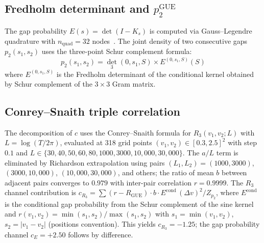\subsection*{Fredholm determinant and $p_2^{\mathrm{GUE}}$}

The gap probability $E(s) = \det(I - K_s)$ is computed via Gauss--Legendre
quadrature with $n_{\mathrm{quad}} = 32$ nodes~\cite{bornemann2010}.
The joint density of two consecutive gaps $p_2(s_1, s_2)$ uses the
three-point Schur complement formula:
\begin{equation}
p_2(s_1, s_2) = \det_3(0, s_1, S) \times E^{(0, s_1, S)}(S)
\end{equation}
where $E^{(0, s_1, S)}$ is the Fredholm determinant of the conditional kernel
obtained by Schur complement of the $3\times 3$ Gram matrix.

\subsection*{Conrey--Snaith triple correlation}

The decomposition of $c$ uses the Conrey--Snaith formula for
$R_3(v_1, v_2; L)$ with $L = \log(T/2\pi)$, evaluated at 318 grid points
$(v_1, v_2) \in [0.3, 2.5]^2$ with step $0.1$ and
$L \in \{30, 40, 50, 60, 80, 1000, 3000, 10{,}000, 30{,}000\}$.
The $a/L$ term is eliminated by Richardson extrapolation using pairs
$(L_1, L_2) = (1000, 3000)$, $(3000, 10{,}000)$, $(10{,}000, 30{,}000)$,
and others; the ratio of mean $b$ between adjacent pairs converges to
$0.979$ with inter-pair correlation $r = 0.9999$.
The $R_3$ channel contribution is $c_{R_3} = \sum (r - R_{\mathrm{GUE}}) \cdot b
\cdot E^{\mathrm{cond}}\, (\Delta v)^2 / Z_{p_2}$, where $E^{\mathrm{cond}}$ is
the conditional gap probability from the Schur complement of the sine kernel
and $r(v_1, v_2) = \min(s_1, s_2)/\max(s_1, s_2)$ with $s_1 = \min(v_1, v_2)$,
$s_2 = |v_1 - v_2|$ (positions convention). This yields $c_{R_3} = -1.25$;
the gap probability channel $c_E = +2.50$ follows by difference.
